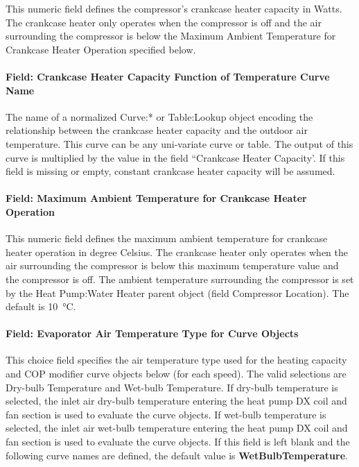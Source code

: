 This numeric field defines the compressor's crankcase heater capacity in Watts.
The crankcase heater only operates when the compressor is off and the air surrounding the compressor is below the Maximum Ambient Temperature for Crankcase Heater Operation specified below.

\paragraph{Field: Crankcase Heater Capacity Function of Temperature Curve Name}

The name of a normalized Curve:* or Table:Lookup object encoding the relationship between the crankcase heater capacity and the outdoor air temperature. This curve can be any uni-variate curve or table. The output of this curve is multiplied by the value in the field ``Crankcase Heater Capacity'. If this field is missing or empty, constant crankcase heater capacity will be
assumed.

\paragraph{Field: Maximum Ambient Temperature for Crankcase Heater Operation}\label{vshpwhheating-maximum-ambient-temperature-for-crankcase-heater-operation}

This numeric field defines the maximum ambient temperature for crankcase heater operation in degree Celsius.
The crankcase heater only operates when the air surrounding the compressor is below this maximum temperature value and the compressor is off.
The ambient temperature surrounding the compressor is set by the Heat Pump:Water Heater parent object (field Compressor Location).
The default is \SI{10}{\celsius}.

\paragraph{Field: Evaporator Air Temperature Type for Curve Objects}\label{vshpwhheating-evaporator-air-temperature-type-for-curve-objects}

This choice field specifies the air temperature type used for the heating capacity and COP modifier curve objects below (for each speed).
The valid selections are Dry-bulb Temperature and Wet-bulb Temperature.
If dry-bulb temperature is selected, the inlet air dry-bulb temperature entering the heat pump DX coil and fan section is used to evaluate the curve objects.
If wet-bulb temperature is selected, the inlet air wet-bulb temperature entering the heat pump DX coil and fan section is used to evaluate the curve objects.
If this field is left blank and the following curve names are defined, the default value is \textbf{WetBulbTemperature}.


